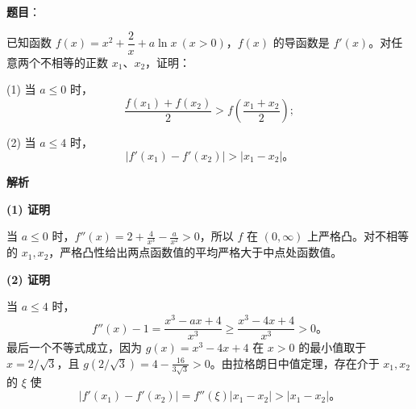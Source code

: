 \begin{answer}

\textbf{题目}：

已知函数 $f(x)=x^2+\dfrac2x+a\ln x\ (x>0)$，$f(x)$ 的导函数是 $f'(x)$。对任意两个不相等的正数 $x_1\text{、}x_2$，证明：

(1) 当 $a\leqslant0$ 时，
\nopagebreak[4]
\[
\frac{f(x_1)+f(x_2)}2>f\left(\frac{x_1+x_2}2\right);
\]

(2) 当 $a\leqslant4$ 时，
\nopagebreak[4]
\[
|f'(x_1)-f'(x_2)|>|x_1-x_2|\mbox{。}
\]

\textbf{解析}

\textbf{(1) 证明}

当 $a\leqslant0$ 时，$f''(x)=2+\frac4{x^3}-\frac a{x^2}>0$，所以 $f$ 在 $(0,\infty)$ 上严格凸。对不相等的 $x_1,x_2$，严格凸性给出两点函数值的平均严格大于中点处函数值。

\textbf{(2) 证明}

当 $a\leqslant4$ 时，
\nopagebreak[4]
\[
f''(x)-1=\frac{x^3-ax+4}{x^3}\geqslant\frac{x^3-4x+4}{x^3}>0\mbox{。}
\]
最后一个不等式成立，因为 $g(x)=x^3-4x+4$ 在 $x>0$ 的最小值取于 $x=2/\sqrt3$，且 $g(2/\sqrt3)=4-\frac{16}{3\sqrt3}>0$。由拉格朗日中值定理，存在介于 $x_1,x_2$ 的 $\xi$ 使
\nopagebreak[4]
\[
|f'(x_1)-f'(x_2)|=f''(\xi)|x_1-x_2|>|x_1-x_2|\mbox{。}
\]



\end{answer}